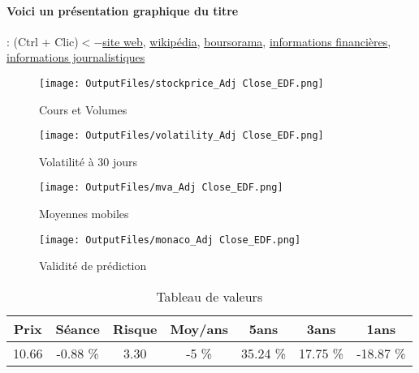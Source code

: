\documentclass[11pt,a4paper]{report}%
\begin{document}
\paragraph{Voici un présentation graphique du titre} : (Ctrl + Clic)$<-$\href{https://www.edf.fr/groupe-edf/espaces-dedies/investisseurs-actionnaires}{site web}, \href{https://fr.wikipedia.org/wiki/%C3%89lectricit%C3%A9_de_France}{wikipédia}, \href{https://www.boursorama.com/cours/1rPEDF}{boursorama}, \href{https://www.qwant.com/?q=site:https:%2f%2fwww.easybourse.com%2faction-societe%2fEDF&t=web&client=ext-firefox-hp}{informations financières}, \href{https://bourse.lerevenu.com/cours-de-bourse/fiche-valeur-synthese/EDF/EDF-FR}{informations journalistiques}
\begin{figure}[!htb]
   \begin{minipage}{0.5\textwidth}
     \centering
     \texttt{[image: OutputFiles/stockprice\_Adj Close\_EDF.png]}
     \caption{Cours et Volumes}\label{Fig:price_EDF}
   \end{minipage}\hfill
   \begin{minipage}{0.5\textwidth}
     \centering
     \texttt{[image: OutputFiles/volatility\_Adj Close\_EDF.png]}
     \caption{Volatilité à 30 jours}\label{Fig:volat_EDF}
   \end{minipage}
\end{figure}
\begin{figure}[!htb]
   \begin{minipage}{0.5\textwidth}
     \centering
     \texttt{[image: OutputFiles/mva\_Adj Close\_EDF.png]}
     \caption{Moyennes mobiles}\label{Fig:mva_EDF}
   \end{minipage}\hfill
   \begin{minipage}{0.5\textwidth}
     \centering
     \texttt{[image: OutputFiles/monaco\_Adj Close\_EDF.png]}
     \caption{Validité de prédiction}\label{Fig:prediction_EDF}
   \end{minipage}
\end{figure}

\begin{table}[H]
  \centering
    \begin{tabular}{|c|c|c|c|c|c|c|}
    \hline
    Prix & Séance & Risque  & Moy/ans & 5ans & 3ans & 1ans \\
    \hline
    10.66 &    -0.88 \%    & 3.30 & -5 \% & 35.24 \% & 17.75 \% & -18.87 \% \\
    \hline
    \end{tabular}%
        \label{tab:table_EDF}%
      \caption{Tableau de valeurs}
\end{table}%
\end{document}
